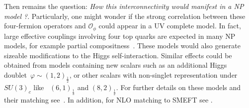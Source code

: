 Then remains the question: \textit{How this interconnectivity would manifest in a NP model ?}. Particularly, one might wonder if the strong correlation between these four-fermion operators and $\mathcal{O}_\phi$ could appear in a UV complete model. In fact, large effective couplings involving four top quarks are expected in many NP models, for example partial compositness~\cite{Banelli:2020iau}. These models would also generate sizeable modifications to the Higgs self-interaction. Similar effects could be obtained from models containing new scalars such as an additional Higgs doublet~$\varphi\sim (1,2)_{\frac 12}$, or other scalars with non-singlet representation under $SU(3)_c$ like~ $(6,1)_{\frac 1 3}$ and $(8,2)_{\frac 1 2}$. For further details on these models and their matching see~\cite{deBlas:2017xtg}. In addition, for NLO matching to SMEFT see \cite{Anisha:2021hgc}. 